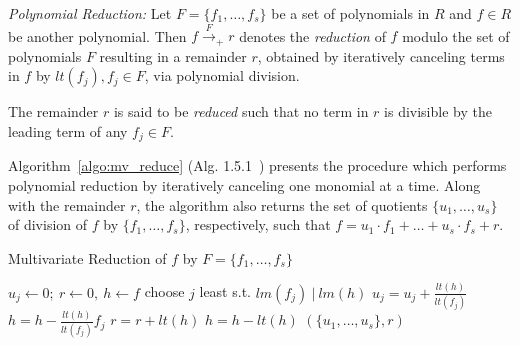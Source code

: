
{\it Polynomial Reduction:} Let $F=\{f_1,\dots,f_s\}$ be
a set of polynomials in $R$ and $f\in R$ be 
another polynomial. Then $f\xrightarrow{F}_+r$ denotes the {\it
  reduction} of $f$ modulo the set of polynomials $F$ resulting in a
remainder $r$, obtained by iteratively canceling terms in $f$ by
$lt(f_j), f_j\in F$, via polynomial division. 
{\red The remainder $r$ is said to be {\it reduced} such that no term in $r$ is
divisible by the leading term of any $f_j \in F$.

Algorithm~\ref{algo:mv_reduce} (Alg.
1.5.1~\cite{gb_book}) presents the procedure which
performs polynomial reduction by iteratively canceling
one monomial at a time.
Along with the remainder $r$, the algorithm also returns
the set of quotients $\{u_1,\dots,u_s\}$ of division of $f$ by
$\{f_1,\dots,f_s\}$, respectively, such that $f = u_1\cdot
f_1+\dots+u_s\cdot f_s + r$.

{\small
\begin{algorithm}[hbt]
 \caption{Multivariate Reduction of $f$ by $F=\{f_1,\dots,f_s\}$}
 \label{algo:mv_reduce}
 \begin{algorithmic}[1]
 \State $u_j \gets 0; ~r \gets 0, ~h \gets f $ 
 \State choose $j$ least s.t. $lm(f_j) ~|~ lm(h)$
 \State $u_j = u_j + \frac{lt(h)}{lt(f_j)}$
 \State $h = h - \frac{lt(h)}{lt(f_j)} f_j$
 \Else
 \State $r = r+ lt(h)$
 \State $h = h - lt(h)$
 \EndIf
 \EndWhile
 \State \Return $(\{u_1,\dots,u_s\} , r)$
 \EndProcedure
 \end{algorithmic}
 \end{algorithm}
}
}

